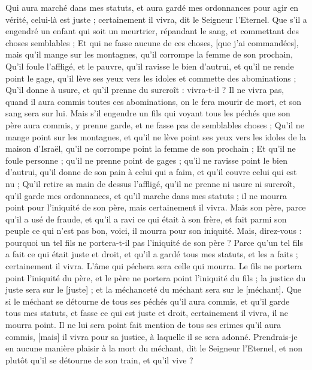 \begin{multicols}{2}
Qui aura marché dans mes statuts, et aura gardé mes ordonnances pour agir en vérité, celui-là est juste ; certainement il vivra, dit le Seigneur l'Eternel.
Que s'il a engendré un enfant qui soit un meurtrier, répandant le sang, et commettant des choses semblables ;
Et qui ne fasse aucune de ces choses, [que j'ai commandées], mais qu'il mange sur les montagnes, qu'il corrompe la femme de son prochain,
Qu'il foule l'affligé, et le pauvre, qu'il ravisse le bien d'autrui, et qu'il ne rende point le gage, qu'il lève ses yeux vers les idoles et commette des abominations ;
Qu'il donne à usure, et qu'il prenne du surcroît : vivra-t-il ? Il ne vivra pas, quand il aura commis toutes ces abominations, on le fera mourir de mort, et son sang sera sur lui.
Mais s'il engendre un fils qui voyant tous les péchés que son père aura commis, y prenne garde, et ne fasse pas de semblables choses ;
Qu'il ne mange point sur les montagnes, et qu'il ne lève point ses yeux vers les idoles de la maison d'Israël, qu'il ne corrompe point la femme de son prochain ;
Et qu'il ne foule personne ; qu'il ne prenne point de gages ; qu'il ne ravisse point le bien d'autrui, qu'il donne de son pain à celui qui a faim, et qu'il couvre celui qui est nu ;
Qu'il retire sa main de dessus l'affligé, qu'il ne prenne ni usure ni surcroît, qu'il garde mes ordonnances, et qu'il marche dans mes statuts ; il ne mourra point pour l'iniquité de son père, mais certainement il vivra.
Mais son père, parce qu'il a usé de fraude, et qu'il a ravi ce qui était à son frère, et fait parmi son peuple ce qui n'est pas bon, voici, il mourra pour son iniquité.
Mais, direz-vous : pourquoi un tel fils ne portera-t-il pas l'iniquité de son père ? Parce qu'un tel fils a fait ce qui était juste et droit, et qu'il a gardé tous mes statuts, et les a faits ; certainement il vivra.
L'âme qui péchera sera celle qui mourra. Le fils ne portera point l'iniquité du père, et le père ne portera point l'iniquité du fils ; la justice du juste sera sur le [juste] ; et la méchanceté du méchant sera sur le [méchant].
Que si le méchant se détourne de tous ses péchés qu'il aura commis, et qu'il garde tous mes statuts, et fasse ce qui est juste et droit, certainement il vivra, il ne mourra point.
Il ne lui sera point fait mention de tous ses crimes qu'il aura commis, [mais] il vivra pour sa justice, à laquelle il se sera adonné.
Prendrais-je en aucune manière plaisir à la mort du méchant, dit le Seigneur l'Eternel, et non plutôt qu'il se détourne de son train, et qu'il vive ?

\end{multicols}
